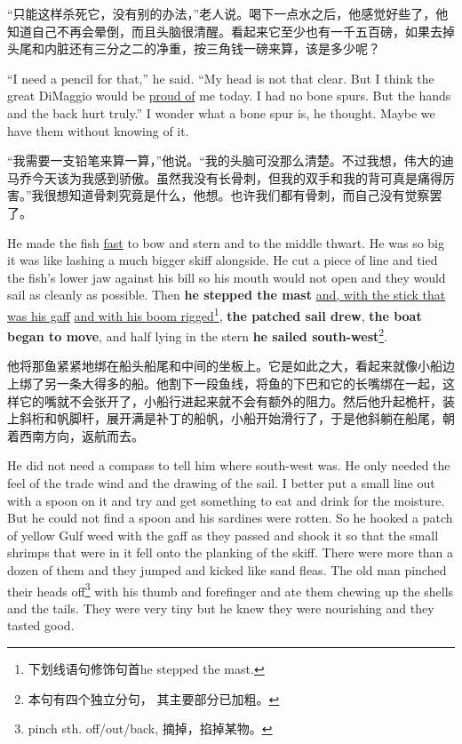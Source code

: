\begin{paracol}{2}
“只能这样杀死它，没有别的办法，”老人说。喝下一点水之后，他感觉好些了，他知道自己不再会晕倒，而且头脑很清醒。看起来它至少也有一千五百磅，如果去掉头尾和内脏还有三分之二的净重，按三角钱一磅来算，该是多少呢？

\switchcolumn*

``I need a pencil for that,'' he said. ``My head is not that clear. But I
think the great DiMaggio would be \uline{proud of} me today. I had no bone spurs.
But the hands and the back hurt truly.'' I wonder what a bone spur is, he
thought. Maybe we have them without knowing of it.

\switchcolumn

“我需要一支铅笔来算一算，”他说。“我的头脑可没那么清楚。不过我想，伟大的迪马乔今天该为我感到骄傲。虽然我没有长骨刺，但我的双手和我的背可真是痛得厉害。”我很想知道骨刺究竟是什么，他想。也许我们都有骨刺，而自己没有觉察罢了。

\switchcolumn*

He made the fish \uline{fast} to bow and stern and to the middle thwart. He was so
big it was like lashing a much bigger skiff alongside. He cut a piece of
line and tied the fish's lower jaw against his bill so his mouth would not
open and they would sail as cleanly as possible. Then \textbf{he stepped the
  mast} \uline{and, with the stick that was his gaff} \uline{and with his
  \gls{boom} rigged}\footnote{下划线语句修饰句首he stepped the mast.},
\textbf{the patched sail drew}, \textbf{the boat began to move}, and half
lying in the stern \textbf{he sailed south-west}\footnote{本句有四个独立分句，
  其主要部分已加粗。}.

\switchcolumn

他将那鱼紧紧地绑在船头船尾和中间的坐板上。它是如此之大，看起来就像小船边上绑了另一条大得多的船。他割下一段鱼线，将鱼的下巴和它的长嘴绑在一起，这样它的嘴就不会张开了，小船行进起来就不会有额外的阻力。然后他升起桅杆，装上斜桁和帆脚杆，展开满是补丁的船帆，小船开始滑行了，于是他斜躺在船尾，朝着西南方向，返航而去。

\switchcolumn*

He did not need a \gls{compass} to tell him where south-west was. He only
needed the feel of the trade wind and the drawing of the sail. I better put
a small line out with a spoon on it and try and get something to eat and
drink for the \gls{moisture}. But he could not find a spoon and his sardines
were \gls{rotten}. So he hooked a patch of yellow Gulf weed with the gaff as
they passed and shook it so that the small shrimps that were in it fell onto
the planking of the skiff. There were more than a dozen of them and they
jumped and kicked like sand \glspl{flea}. The old man \gls{pinched} their
heads off\footnote{pinch sth. off/out/back, 摘掉，掐掉某物。} with his thumb
and forefinger and ate them chewing up the shells and the tails. They were
very tiny but he knew they were \gls{nourishing} and they tasted good.


\end{paracol}
